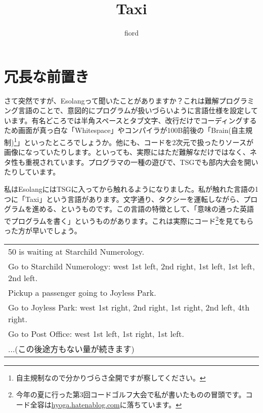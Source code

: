 \documentclass[12pt]{jsarticle}
\title{Taxi}
\author{fiord}
\begin{document}
	\begin{comment}
	\begin{shadebox}
		\begin{center}
			\textbf{\Huge Taxi}
		\end{center}
		\begin{flushright}
			fiord
		\end{flushright}
	\end{shadebox}
	\hspace{20mm}
	\begin{screen}
	\end{comment}
	\section{冗長な前置き}
		
	
	さて突然ですが、Esolangって聞いたことがありますか？これは難解プログラミング言語のことで、意図的にプログラムが扱いづらいように言語仕様を設定しています。有名どころでは半角スペースとタブ文字、改行だけでコーディングするため画面が真っ白な「Whitespace」やコンパイラが100B前後の「Brain(自主規制)\footnote{自主規制なので分かりづらさ全開ですが察してください。}」といったところでしょうか。他にも、コードを2次元で扱ったりソースが画像になっていたりします。といっても、実際にはただ難解なだけではなく、ネタ性も重視されています。プログラマの一種の遊びで、TSGでも部内大会を開いたりしています。
	
	私はEsolangにはTSGに入ってから触れるようになりました。私が触れた言語の1つに「Taxi」という言語があります。文字通り、タクシーを運転しながら、プログラムを進める、というものです。この言語の特徴として、「意味の通った英語でプログラムを書く」というものがあります。これは実際にコード\footnote{今年の夏に行った第3回コードゴルフ大会で私が書いたものの冒頭です。コード全容は\url{hyoga.hatenablog.com}に落ちています。}を見てもらった方が早いでしょう。
	\begin{table}[h]
		\centering
		\begin{tabular}{|l|}
			\hline
			50 is waiting at Starchild Numerology.\\
			Go to Starchild Numerology: west 1st left, 2nd right, 1st left, 1st left, 2nd left.\\
			Pickup a passenger going to Joyless Park.\\
			Go to Joyless Park: west 1st right, 2nd right, 1st right, 2nd left, 4th right.\\
			Go to Post Office: west 1st left, 1st right, 1st left.\\
			...(この後途方もない量が続きます)\\
			\hline
		\end{tabular}
	\end{table}
\end{document}

